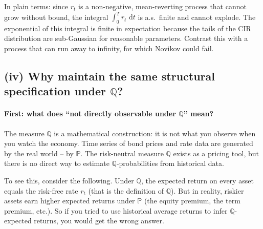 \documentclass[11pt]{article}
\newcommand{\PP}{\mathbb{P}}
\newcommand{\QQ}{\mathbb{Q}}
\newcommand{\dd}{\,\mathrm{d}}
\begin{document}
\begin{intuition}
In plain terms: since $r_t$ is a non-negative, mean-reverting process that
cannot grow without bound, the integral $\int_0^T r_t\,\dd t$ is a.s.\
finite and cannot explode.  The exponential of this integral is finite in
expectation because the tails of the CIR distribution are sub-Gaussian for
reasonable parameters.  Contrast this with a process that can run away to
infinity, for which Novikov could fail.
\end{intuition}

\subsection{(iv) Why maintain the same structural specification under $\QQ$?}

\paragraph{First: what does ``not directly observable under $\QQ$'' mean?}
The measure $\QQ$ is a mathematical construction: it is not what you
observe when you watch the economy.  Time series of bond prices and rate
data are generated by the real world -- by $\PP$.  The risk-neutral measure
$\QQ$ exists as a pricing tool, but there is no direct way to estimate
$\QQ$-probabilities from historical data.

To see this, consider the following.  Under $\QQ$, the expected return on
every asset equals the risk-free rate $r_t$ (that is the definition of
$\QQ$).  But in reality, riskier assets earn higher expected returns under
$\PP$ (the equity premium, the term premium, etc.).  So if you tried to
use historical average returns to infer $\QQ$-expected returns, you would
get the wrong answer.
\end{document}
